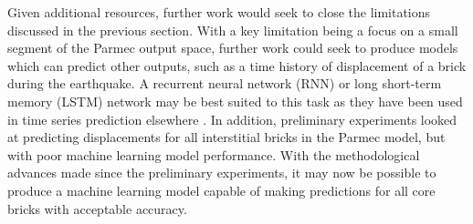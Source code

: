 Given additional resources, further work would seek to close the limitations discussed in the previous section. With a key limitation being a focus on a small segment of the Parmec output space, further work could seek to produce models which can predict other outputs, such as a time history of displacement of a brick during the earthquake. A recurrent neural network (RNN) or long short-term memory (LSTM) network \cite{sherstinsky2020fundamentals} may be best suited to this task as they have been used in time series prediction elsewhere \cite{elsworth2020time}. In addition, preliminary experiments looked at predicting displacements for all interstitial bricks in the Parmec model, but with poor machine learning model performance. With the methodological advances made since the preliminary experiments, it may now be possible to produce a machine learning model capable of making predictions for all core bricks with acceptable accuracy. 





